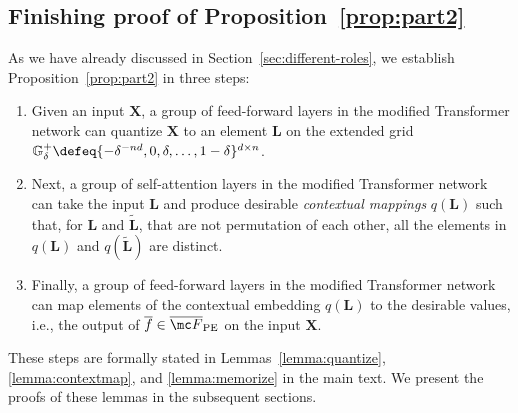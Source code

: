 \documentclass{article} %
\def\mL{{\bm{L}}}
\def\mX{{\bm{X}}}
\def\sG{{\mathbb{G}}}
\begin{document}
\subsection{Finishing proof of Proposition~\ref{prop:part2}}
\label{sec:appx_proof_prop}


As we have already discussed in Section~\ref{sec:different-roles}, we establish Proposition~\ref{prop:part2} in three steps: 
\begin{enumerate}
\item Given an input $\mX$, a group of feed-forward layers in the modified Transformer network can quantize $\mX$ to an element $\mL$ on the extended grid $\sG^+_{\delta} \defeq \{ -\delta^{-nd}, 0, \delta, \dots, 1-\delta \}^{d \times n}$.
\item Next, a group of self-attention layers in the modified Transformer network can take the input $\mL$ and produce desirable {\em contextual mappings} $q(\mL)$ such that, for $\mL$ and $\tilde{\mL}$, that are not permutation of each other, all the elements in $q(\mL)$ and $q(\tilde{\mL})$ are distinct.
\item Finally, a group of feed-forward layers in the modified Transformer network can map elements of the contextual embedding $q(\mL)$ to the desirable values, i.e., the output of $\overline{f} \in \overline{\mc F}_{\rm PE}$ on the input $\mX$.
\end{enumerate}
These steps are formally stated in Lemmas~\ref{lemma:quantize}, \ref{lemma:contextmap}, and \ref{lemma:memorize} in the main text. We present the proofs of these lemmas in the subsequent sections.
\end{document}
